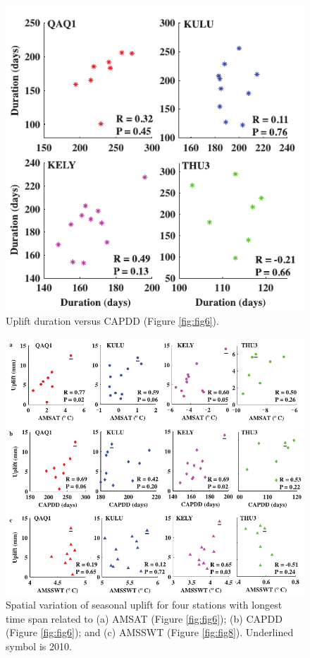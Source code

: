 \clearpage
\begin{figure}
 \centering
 \includegraphics{figs_chpt3/2012GC004432-p10.pdf} 
 \caption{Uplift duration versus CAPDD (Figure \ref{fig:fig6}).}
 \label{fig:fig10}
\end{figure}

\clearpage
\begin{figure}
 \centering
 \includegraphics{figs_chpt3/2012GC004432-p11.pdf} 
 \caption[Spatial variation of seasonal uplift for four stations with longest time span related to (a) AMSAT (Figure \ref{fig:fig6}); (b) CAPDD (Figure \ref{fig:fig6}); and (c) AMSSWT (Figure \ref{fig:fig8}).]{Spatial variation of seasonal uplift for four stations with longest time span related to (a) AMSAT (Figure \ref{fig:fig6}); (b) CAPDD (Figure \ref{fig:fig6}); and (c) AMSSWT (Figure \ref{fig:fig8}). Underlined symbol is 2010.}
 \label{fig:fig11}
\end{figure}

